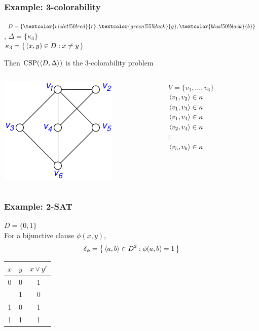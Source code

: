 \documentclass[12pt,xcolor=dvipsnames%
]{beamer}
\DeclareMathOperator{\CSP}{CSP}
\renewcommand{\.}{\cdot}
\newcommand{\Blue}{\textcolor{blue!50!black}}
\newcommand{\Red}{\textcolor{violet!50!red}}
\newcommand{\Green}{\textcolor{green!55!black}}
\begin{document}
\begin{frame}
  \frametitle{Example: 3-colorability}

  $D=\{\Red{r},\Green{g},\Blue{b}\}$, \quad $\Delta=\{\kappa_3\}$\\
  $\kappa_3=\left\{\,(x,y)\in D : x\neq y\,\right\}$

  Then $\CSP(\<D,\Delta\>)$ is the 3-colorability problem

  \bigskip

    \begin{columns}
      \begin{column}{1.5in}
        \includegraphics{col_csp}
      \end{column}
      \begin{column}{2in}
        $V=\{v_1,\dots,v_6\}$\\
        $\langle v_1,v_2\rangle\in \kappa$\\
        $\langle v_1,v_3\rangle\in \kappa$\\
        $\langle v_1,v_4\rangle\in \kappa$\\
        $\langle v_2,v_4\rangle\in \kappa$\\
        \qquad$\vdots$\\
        $\langle v_5,v_6\rangle\in \kappa$
      \end{column}
    \end{columns}
  \end{frame}

\begin{frame}
\frametitle{Example: 2-SAT}
$D=\{0,1\}$\\
For a bijunctive clause $\phi(x,y)$, 
\begin{equation*}
\delta_\phi= \left\{\,\langle a,b\rangle\in D^2: \phi(a,b)=1\,\right\}
\end{equation*}

\pause
\begin{tabular}{cc|c}
 $x$ & $y$ &$x\vee y'$  \\
 \hline
0 & 0 & 1\\
\visible<2>{0 & 1 & 0}\\
1 & 0 & 1\\
1 & 1 & 1
\end{tabular}

\bigskip
{}
\end{frame}
\end{document}
